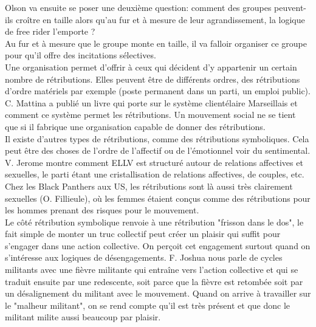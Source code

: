\documentclass[10pt, a4paper, openany]{book}
\begin{document}
Olson va ensuite se poser une deuxième question: comment des groupes peuvent-ils croître en taille alors qu'au fur et à mesure de leur agrandissement, la logique de free rider l'emporte ? \\
Au fur et à mesure que le groupe monte en taille, il va falloir organiser ce groupe pour qu'il offre des incitations sélectives. \\
Une organisation permet d'offrir à ceux qui décident d'y appartenir un certain nombre de rétributions. Elles peuvent être de différents ordres, des rétributions d'ordre matériels par exemple (poste permanent dans un parti, un emploi public). C. Mattina a publié un livre qui porte sur le système clientélaire Marseillais et comment ce système permet les rétributions. Un mouvement social ne se tient que si il fabrique une organisation capable de donner des rétributions. \\
Il existe d'autres types de rétributions, comme des rétributions symboliques. Cela peut être des choses de l'ordre de l'affectif ou de l'émotionnel voir du sentimental. V. Jerome montre comment ELLV est structuré autour de relations affectives et sexuelles, le parti étant une cristallisation de relations affectives, de couples, etc. Chez les Black Panthers aux US, les rétributions sont là aussi très clairement sexuelles (O. Fillieule), où les femmes étaient conçus comme des rétributions pour les hommes prenant des risques pour le mouvement. \\
Le côté rétribution symbolique renvoie à une rétribution "frisson dans le dos", le fait simple de monter un truc collectif peut créer un plaisir qui suffit pour s'engager dans une action collective. On perçoit cet engagement surtout quand on s'intéresse aux logiques de désengagements. F. Joshua nous parle de cycles militants avec une fièvre militante qui entraîne vers l'action collective et qui se traduit ensuite par une redescente, soit parce que la fièvre est retombée soit par un désalignement du militant avec le mouvement. Quand on arrive à travailler sur le "malheur militant", on se rend compte qu'il est très présent et que donc le militant milite aussi beaucoup par plaisir.
\end{document}
